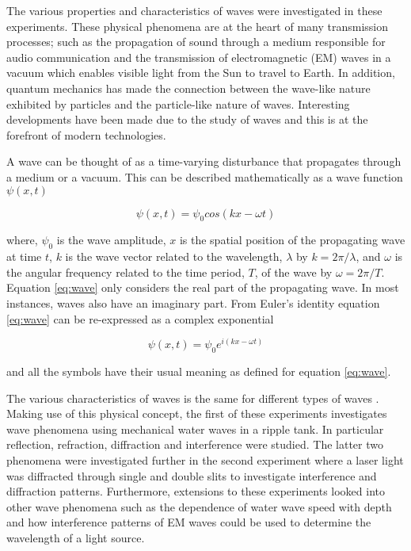 \documentclass{article}
\begin{document}
The various properties and characteristics of waves were investigated in these experiments. These physical phenomena are at the heart of many transmission processes; such as the propagation of sound through a medium responsible for audio communication and the transmission of electromagnetic (EM) waves in a vacuum which enables visible light from the Sun to travel to Earth. In addition, quantum mechanics has made the connection between the wave-like nature exhibited by particles and the particle-like nature of waves. Interesting developments have been made due to the study of waves and this is at the forefront of modern technologies.

\vspace{2mm}
\noindent
A wave can be thought of as a time-varying disturbance that propagates through a medium or a vacuum. This can be described mathematically as a wave function $\psi(x, t)$

\begin{equation}
\label{eq:wave}
\psi(x, t) = \psi_0 cos(kx - \omega t)
\end{equation}

\vspace{2mm}
\noindent
where, $\psi_0$ is the wave amplitude, $x$ is the spatial position of the propagating wave at time $t$, $k$ is the wave vector related to the wavelength, $\lambda$ by $k = 2\pi / {\lambda}$, and $\omega$ is the angular frequency related to the time period, $T$, of the wave by $\omega = {2\pi} / {T}$. Equation \eqref{eq:wave} only considers the real part of the propagating wave. In most instances, waves also have an imaginary part. From Euler's identity equation \eqref{eq:wave} can be re-expressed as a complex exponential

\begin{equation}
\label{eq:complex-wave}
\psi(x, t) = \psi_0 e^{i(kx - \omega t)}
\end{equation}

\vspace{2mm}
\noindent
and all the symbols have their usual meaning as defined for equation \eqref{eq:wave}.

\vspace{2mm}
\noindent
The various characteristics of waves is the same for different types of waves \cite{Paper01}. Making use of this physical concept, the first of these experiments investigates wave phenomena using mechanical water waves in a ripple tank. In particular reflection, refraction, diffraction and interference were studied. The latter two phenomena were investigated further in the second experiment where a laser light was diffracted through single and double slits to investigate interference and diffraction patterns. Furthermore, extensions to these experiments looked into other wave phenomena such as the dependence of water wave speed with  depth and how interference patterns of EM waves could be used to determine the wavelength of a light source.
\end{document}
